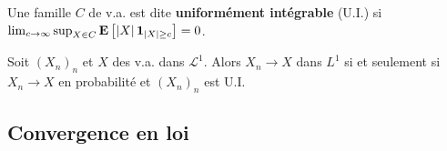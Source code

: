 

	\begin{defn}
		Une famille $C$ de v.a. est dite \textbf{uniformément intégrable} (U.I.) si $\lim_{c \to \infty} \sup_{X \in C} \mathbf{E} \left[ \left\lvert X\right\rvert \operatorname{\mathbf{1}}_{\left\lvert X\right\rvert \geq c} \right] = 0$.
	\end{defn}

	\begin{thm}
		Soit $(X_n)_n$ et $X$ des v.a. dans $\mathcal{L}^1$.
		Alors $X_n \longrightarrow  X$ dans $L^1$ si et seulement si $X_n \longrightarrow X$ en probabilité et $(X_n)_n$ est U.I.
	\end{thm}


\subsection{Convergence en loi}

	
